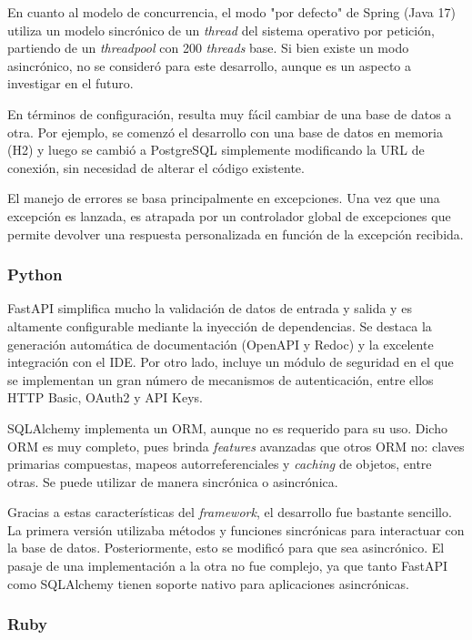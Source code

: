 \documentclass[11pt]{article}
\let\Oldsubsubsection\subsubsection
\renewcommand{\subsubsection}{\FloatBarrier\Oldsubsubsection}
\newcommand{\english}[1]{\textit{#1}}
\begin{document}
En cuanto al modelo de concurrencia, el modo "por defecto" de Spring (Java 17) utiliza un modelo sincrónico de un \english{thread} del sistema operativo por petición, partiendo de un \english{threadpool} con 200 \english{threads} base. Si bien existe un modo asincrónico, no se consideró para este desarrollo, aunque es un aspecto a investigar en el futuro.

En términos de configuración, resulta muy fácil cambiar de una base de datos a otra. Por ejemplo, se comenzó el desarrollo con una base de datos en memoria (H2) y luego se cambió a PostgreSQL simplemente modificando la URL de conexión, sin necesidad de alterar el código existente.

El manejo de errores se basa principalmente en excepciones. Una vez que una excepción es lanzada, es atrapada por un controlador global de excepciones que permite devolver una respuesta personalizada en función de la excepción recibida.


\subsubsection{Python}

FastAPI simplifica mucho la validación de datos de entrada y salida y es altamente configurable mediante la inyección de dependencias. Se destaca la generación automática de documentación (OpenAPI y Redoc) y la excelente integración con el IDE. Por otro lado, incluye un módulo de seguridad en el que se implementan un gran número de mecanismos de autenticación, entre ellos HTTP Basic, OAuth2 y API Keys.

SQLAlchemy implementa un ORM, aunque no es requerido para su uso. Dicho ORM es muy completo, pues brinda \english{features} avanzadas que otros ORM no: claves primarias compuestas, mapeos autorreferenciales y \english{caching} de objetos, entre otras. Se puede utilizar de manera sincrónica o asincrónica.

Gracias a estas características del \english{framework}, el desarrollo fue bastante sencillo. La primera versión utilizaba métodos y funciones sincrónicas para interactuar con la base de datos. Posteriormente, esto se modificó para que sea asincrónico. El pasaje de una implementación a la otra no fue complejo, ya que tanto FastAPI como SQLAlchemy tienen soporte nativo para aplicaciones asincrónicas.

\subsubsection{Ruby}
\end{document}
